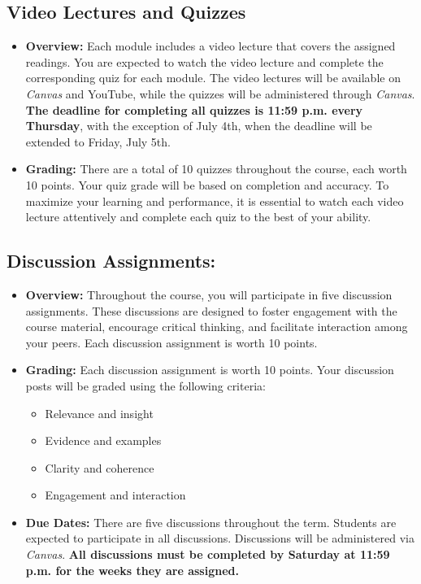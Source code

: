 \documentclass[11pt, letterpaper]{article}
\begin{document}
\subsection*{Video Lectures and Quizzes}
\begin{itemize}
    \item \textbf{Overview:} Each module includes a video lecture that covers the assigned readings. You are expected to watch the video lecture and complete the corresponding quiz for each module. The video lectures will be available on \emph{Canvas} and YouTube, while the quizzes will be administered through \emph{Canvas}. \textbf{The deadline for completing all quizzes is 11:59 p.m. every Thursday}, with the exception of July 4th, when the deadline will be extended to Friday, July 5th.
    \item \textbf{Grading:} There are a total of 10 quizzes throughout the course, each worth 10 points. Your quiz grade will be based on completion and accuracy. To maximize your learning and performance, it is essential to watch each video lecture attentively and complete each quiz to the best of your ability.
\end{itemize}

\subsection*{Discussion Assignments:}
    \begin{itemize}
        \item \textbf{Overview:} Throughout the course, you will participate in five discussion assignments. These discussions are designed to foster engagement with the course material, encourage critical thinking, and facilitate interaction among your peers. Each discussion assignment is worth 10 points.
        \item \textbf{Grading:} Each discussion assignment is worth 10 points. Your discussion posts will be graded using the following criteria:
            \begin{itemize}
                \item Relevance and insight
                \item Evidence and examples
                \item Clarity and coherence
                \item Engagement and interaction
            \end{itemize}
        \item \textbf{Due Dates:} There are five discussions throughout the term. Students are expected to participate in all discussions. Discussions will be administered via \emph{Canvas}. \textbf{All discussions must be completed by Saturday at 11:59 p.m. for the weeks they are assigned.}
    \end{itemize}
\end{document}

